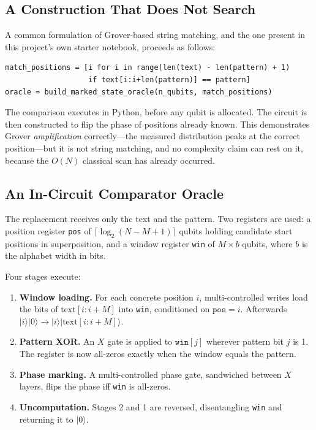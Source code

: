 \documentclass[11pt,a4paper]{article}
\begin{document}
\subsection{A Construction That Does Not Search}

A common formulation of Grover-based string matching, and the one present in this
project's own starter notebook, proceeds as follows:

\begin{lstlisting}
match_positions = [i for i in range(len(text) - len(pattern) + 1)
                   if text[i:i+len(pattern)] == pattern]
oracle = build_marked_state_oracle(n_qubits, match_positions)
\end{lstlisting}

The comparison executes in Python, before any qubit is allocated. The circuit is
then constructed to flip the phase of positions already known. This demonstrates
Grover \emph{amplification} correctly---the measured distribution peaks at the
correct position---but it is not string matching, and no complexity claim can
rest on it, because the $O(N)$ classical scan has already occurred.

\subsection{An In-Circuit Comparator Oracle}

The replacement receives only the text and the pattern. Two registers are used:
a position register \texttt{pos} of $\lceil\log_2(N-M+1)\rceil$ qubits holding
candidate start positions in superposition, and a window register \texttt{win} of
$M \times b$ qubits, where $b$ is the alphabet width in bits.

Four stages execute:

\begin{enumerate}
\item \textbf{Window loading.} For each concrete position $i$, multi-controlled
      writes load the bits of $\text{text}[i:i+M]$ into \texttt{win},
      conditioned on $\texttt{pos} = i$. Afterwards
      $|i\rangle|0\rangle \rightarrow |i\rangle|\text{text}[i:i+M]\rangle$.
\item \textbf{Pattern XOR.} An $X$ gate is applied to $\texttt{win}[j]$ wherever
      pattern bit $j$ is 1. The register is now all-zeros exactly when the
      window equals the pattern.
\item \textbf{Phase marking.} A multi-controlled phase gate, sandwiched between
      $X$ layers, flips the phase iff \texttt{win} is all-zeros.
\item \textbf{Uncomputation.} Stages 2 and 1 are reversed, disentangling
      \texttt{win} and returning it to $|0\rangle$.
\end{enumerate}
\end{document}
